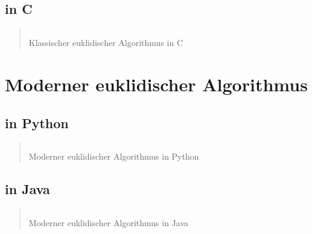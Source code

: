\documentclass[12pt, 
               a4paper, 
               openright,
               parskip=full, 
               chapterentrydots=true,
               listof=entryprefix,
               numbers=endperiod]{scrbook}
\begin{document}
\newpage
\section{in C}
\begin{listing}[!ht]
\begin{quote}
\renewcommand{\theFancyVerbLine}{
  \sffamily\textcolor[rgb]{0.5,0.5,0.5}{\scriptsize\arabic{FancyVerbLine}}}

\inputminted[linenos, breaklines, numbersep=5pt, tabsize=4, frame=leftline]{C}{./listings/ggT.c}
\caption{Klassischer euklidischer Algorithmus in C}
\end{quote}
\end{listing}


\chapter{Moderner euklidischer Algorithmus}
\newpage
\thispagestyle{empty}
\mbox{}
\newpage
\section{in Python}
\begin{listing}[!ht]
\begin{quote}
\renewcommand{\theFancyVerbLine}{
  \sffamily\textcolor[rgb]{0.5,0.5,0.5}{\scriptsize\arabic{FancyVerbLine}}}

\inputminted[linenos, breaklines, numbersep=5pt, tabsize=4, frame=leftline]{python}{./listings/ggT_division.py}
\caption{Moderner euklidischer Algorithmus in Python}
\end{quote}
\end{listing}

\newpage
\section{in Java}
\begin{listing}[!ht]
\begin{quote}
\renewcommand{\theFancyVerbLine}{
  \sffamily\textcolor[rgb]{0.5,0.5,0.5}{\scriptsize\arabic{FancyVerbLine}}}

\inputminted[linenos, breaklines, numbersep=5pt, tabsize=4, frame=leftline]{java}{./listings/ggT_division.java}
\caption{Moderner euklidischer Algorithmus in Java}
\end{quote}
\end{listing}
\end{document}

